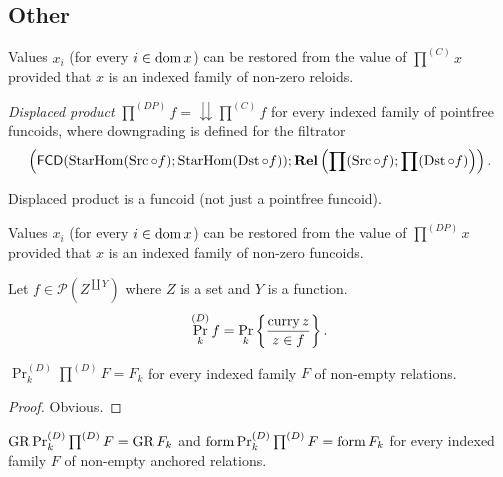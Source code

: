 \subsection{Other}
\begin{conjecture}
Values $x_{i}$ (for every $i\in\operatorname{dom} x$) can be restored from the
value of $\prod^{(C)}x$ provided that $x$ is an indexed family of
non-zero reloids.\end{conjecture}
\begin{defn}
\emph{Displaced product} $\prod^{(DP)}f=\downdownarrows\prod^{(C)}f$
for every indexed family of pointfree funcoids, where downgrading
is defined for the filtrator 
\[
\left(\mathsf{FCD}(\operatorname{StarHom}(\operatorname{Src}\circ f);\operatorname{StarHom}(\operatorname{Dst}\circ f));\mathbf{Rel}\left(\prod(\operatorname{Src}\circ f);\prod(\operatorname{Dst}\circ f)\right)\right).
\]
\end{defn}
\begin{rem}
Displaced product is a funcoid (not just a pointfree funcoid).\end{rem}
\begin{conjecture}
Values $x_{i}$ (for every $i\in\operatorname{dom} x$) can be restored from the
value of $\prod^{(DP)}x$ provided that $x$ is an indexed family
of non-zero funcoids.\end{conjecture}
\begin{defn}
Let $f\in\mathscr{P}\left(Z^{\coprod Y}\right)$ where $Z$ is a set
and $Y$ is a function. 
\[
\Pr_{k}^{(D)}f=\Pr_{k}\left\{ \frac{\operatorname{curry} z}{z\in f}\right\}.
\]
\end{defn}
\begin{prop}
$\Pr_{k}^{(D)}\prod^{(D)}F=F_{k}$ for every indexed family $F$ of
non-empty relations.\end{prop}
\begin{proof}
Obvious.\end{proof}
\begin{cor}
$\operatorname{GR}\Pr_{k}^{(D)}\prod^{(D)}F=\operatorname{GR} F_{k}$ and $\operatorname{form}\Pr_{k}^{(D)}\prod^{(D)}F=\operatorname{form} F_{k}$
for every indexed family $F$ of non-empty anchored relations.
\end{cor}


